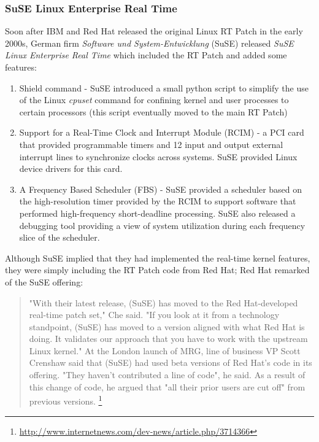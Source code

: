 \documentclass[12pt]{article}
\begin{document}
\subsubsection{SuSE Linux Enterprise Real Time}
Soon after IBM and Red Hat released the original Linux RT Patch in the early
2000s, German firm \emph{Software und System-Entwicklung} (SuSE) released
\emph{SuSE Linux Enterprise Real Time} which included the RT Patch and added
some features:

\begin{enumerate}
\item Shield command - SuSE introduced a small python script to simplify the use
of the Linux \emph{cpuset} command for confining kernel and user processes to
certain processors (this script eventually moved to the main RT Patch)
\item Support for a Real-Time Clock and Interrupt Module (RCIM) - a PCI card
that provided programmable timers and 12 input and output external interrupt
lines to synchronize clocks across systems.  SuSE provided Linux device drivers
for this card.
\item A Frequency Based Scheduler (FBS) - SuSE provided a scheduler based on
the high-resolution timer provided by the RCIM to support software that
performed high-frequency short-deadline processing.  SuSE also released a
debugging tool providing a view of system utilization during each frequency
slice of the scheduler.
\end{enumerate}
\label{ref:suse_rt_features}

Although SuSE implied that they had implemented the real-time kernel features,
they were simply including the RT Patch code from Red Hat; Red Hat remarked of
the SuSE offering:

\begin{quote}
"With their latest release, (SuSE) has moved to the Red Hat-developed real-time
patch set," Che said. "If you look at it from a technology standpoint, (SuSE)
has moved to a version aligned with what Red Hat is doing. It validates our
approach that you have to work with the upstream Linux kernel." At the London
launch of MRG, line of business VP Scott Crenshaw said that (SuSE) had used beta
versions of Red Hat's code in its offering. "They haven't contributed a line of
code", he said. As a result of this change of code, he argued that "all their
prior users are cut off" from previous versions.%
\footnote{\url{http://www.internetnews.com/dev-news/article.php/3714366}}
\end{quote}
\end{document}

